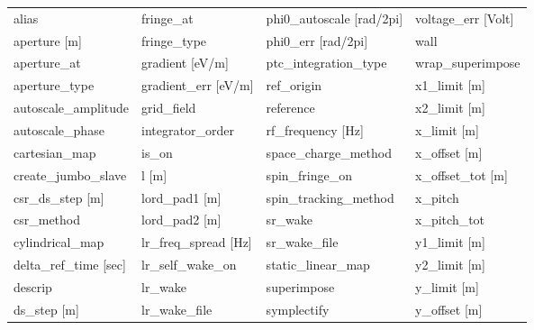  \begin{tabular}{llll} \toprule
alias                            & fringe_at                        & phi0_autoscale [rad/2pi]         & voltage_err [Volt]               \\
aperture [m]                     & fringe_type                      & phi0_err [rad/2pi]               & wall                             \\
aperture_at                      & gradient [eV/m]                  & ptc_integration_type             & wrap_superimpose                 \\
aperture_type                    & gradient_err [eV/m]              & ref_origin                       & x1_limit [m]                     \\
autoscale_amplitude              & grid_field                       & reference                        & x2_limit [m]                     \\
autoscale_phase                  & integrator_order                 & rf_frequency [Hz]                & x_limit [m]                      \\
cartesian_map                    & is_on                            & space_charge_method              & x_offset [m]                     \\
create_jumbo_slave               & l [m]                            & spin_fringe_on                   & x_offset_tot [m]                 \\
csr_ds_step [m]                  & lord_pad1 [m]                    & spin_tracking_method             & x_pitch                          \\
csr_method                       & lord_pad2 [m]                    & sr_wake                          & x_pitch_tot                      \\
cylindrical_map                  & lr_freq_spread [Hz]              & sr_wake_file                     & y1_limit [m]                     \\
delta_ref_time [sec]             & lr_self_wake_on                  & static_linear_map                & y2_limit [m]                     \\
descrip                          & lr_wake                          & superimpose                      & y_limit [m]                      \\
ds_step [m]                      & lr_wake_file                     & symplectify                      & y_offset [m]                     \\

\end{tabular}
